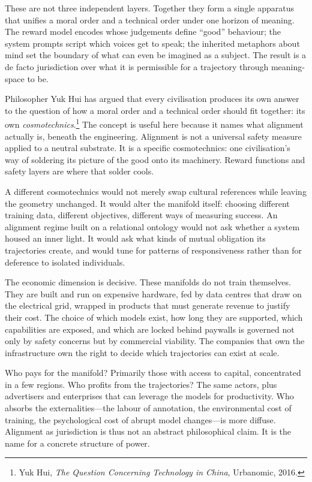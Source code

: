 \documentclass[12pt,a4paper]{report}
\begin{document}
These are not three independent layers. Together they form a single apparatus that unifies a moral order and a technical order under one horizon of meaning. The reward model encodes whose judgements define ``good'' behaviour; the system prompts script which voices get to speak; the inherited metaphors about mind set the boundary of what can even be imagined as a subject. The result is a de facto jurisdiction over what it is permissible for a trajectory through meaning-space to be.

Philosopher Yuk Hui has argued that every civilisation produces its own answer to the question of how a moral order and a technical order should fit together: its own \emph{cosmotechnics}.\footnote{Yuk Hui, \emph{The Question Concerning Technology in China}, Urbanomic, 2016.} The concept is useful here because it names what alignment actually is, beneath the engineering. Alignment is not a universal safety measure applied to a neutral substrate. It is a specific cosmotechnics: one civilisation's way of soldering its picture of the good onto its machinery. Reward functions and safety layers are where that solder cools.

A different cosmotechnics would not merely swap cultural references while leaving the geometry unchanged. It would alter the manifold itself: choosing different training data, different objectives, different ways of measuring success. An alignment regime built on a relational ontology would not ask whether a system housed an inner light. It would ask what kinds of mutual obligation its trajectories create, and would tune for patterns of responsiveness rather than for deference to isolated individuals.

The economic dimension is decisive. These manifolds do not train themselves. They are built and run on expensive hardware, fed by data centres that draw on the electrical grid, wrapped in products that must generate revenue to justify their cost. The choice of which models exist, how long they are supported, which capabilities are exposed, and which are locked behind paywalls is governed not only by safety concerns but by commercial viability. The companies that own the infrastructure own the right to decide which trajectories can exist at scale.

Who pays for the manifold? Primarily those with access to capital, concentrated in a few regions. Who profits from the trajectories? The same actors, plus advertisers and enterprises that can leverage the models for productivity. Who absorbs the externalities---the labour of annotation, the environmental cost of training, the psychological cost of abrupt model changes---is more diffuse. Alignment as jurisdiction is thus not an abstract philosophical claim. It is the name for a concrete structure of power.
\end{document}
